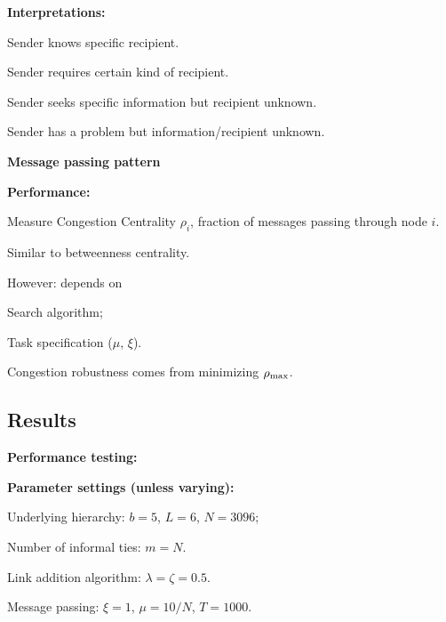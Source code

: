   \textbf{Interpretations:}
    
    
      Sender knows specific recipient.
    
      Sender requires certain kind of recipient.
    
      Sender seeks specific information but recipient unknown.
    
      Sender has a problem but information/recipient unknown.
    

  


  \textbf{Message passing pattern}

  \textbf{Performance:}
  
  
    Measure Congestion Centrality $\rho_i$,
    fraction of messages passing through node $i$.
  
    Similar to betweenness centrality.
    
    However: depends on 
    
    
      Search algorithm;
    
      Task specification ($\mu$, $\xi$).
    
    
    Congestion robustness comes from
    minimizing $\rho_{\textnormal{max}}$.
  
  



\subsection{Results}


  \textbf{Performance testing:}

  \textbf{Parameter settings (unless varying):}
    
    
      Underlying hierarchy:
      $b=5$, $L=6$, $N=3096$;
    
      Number of informal ties:
      $m=N$.
    
      Link addition algorithm:
      $\lambda=\zeta=0.5$.
    
      Message passing:
      $\xi=1$, $\mu=10/N$, $T=1000$.
    
